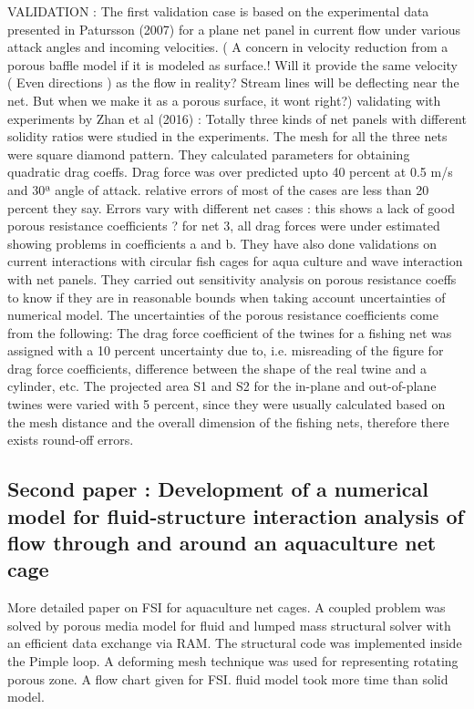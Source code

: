 \documentclass[letterpaper,12pt]{article}
\begin{document}
VALIDATION : The first validation case is based on the experimental data presented in Patursson (2007) for a plane net panel in current
flow under various attack angles and incoming velocities. ( A concern in velocity reduction from a porous baffle model if it is modeled as surface.! Will it provide the same velocity ( Even directions ) as the flow in reality? Stream lines will be deflecting near the net. But when we  make it as a porous surface, it wont right?)
validating with experiments by Zhan et al (2016) : Totally three kinds of net panels with different solidity ratios were studied in the experiments. The mesh for all the three nets were square diamond pattern. They calculated parameters for obtaining quadratic drag coeffs. Drag force was over predicted upto 40 percent  at 0.5 m/s and 30ª angle of attack. relative errors of most of the cases are less than 20 percent they say.
 Errors vary with different net cases : this shows a lack of good porous resistance coefficients ? for net 3, all drag forces were under estimated showing problems in coefficients a and b.
They have also done validations on current interactions with circular fish cages for aqua culture and wave interaction with net panels.
They carried out sensitivity analysis on porous resistance coeffs to know if they are in reasonable bounds when taking account uncertainties of numerical model. The uncertainties of the porous resistance coefficients come from the following: The drag force coefficient of the twines for a fishing net was assigned with a 10 percent uncertainty due to, i.e. misreading of the figure for drag force coefficients, difference between the shape of the real twine and a cylinder, etc. The projected area S1 and S2 for the in-plane and out-of-plane twines were varied with 5 percent, since they were usually calculated based on the mesh distance and the overall dimension of the fishing nets, therefore there exists round-off errors.
\subsection{Second paper : Development of a numerical model for fluid-structure interaction analysis
of flow through and around an aquaculture net cage}
More detailed paper on FSI for aquaculture net cages. A coupled problem was solved by porous media model for fluid and lumped mass structural solver with an efficient data exchange via RAM. The structural code was implemented inside the Pimple loop. A deforming mesh technique was used for representing rotating porous zone. A flow chart given for FSI. fluid model took more time than solid model. 
\end{document}
